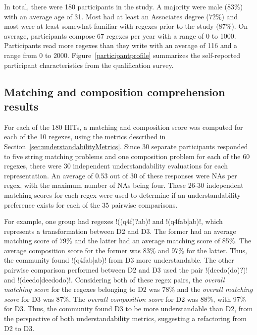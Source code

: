In total, there were 180 participants in the study.
A majority were male (83\%) with an average age of 31. Most had
at least an Associates degree (72\%) and most were at least somewhat familiar with regexes prior to the study (87\%). On average,
participants compose 67 regexes per year with a range of 0 to 1000.
Participants read more regexes than they write with an average of 116 and a range from 0 to 2000.
Figure~\ref{participantprofile} summarizes the self-reported participant characteristics from the qualification survey.

\subsection{Matching and composition comprehension results}
\label{sec:comprehensionResults}

For each of the 180 HITs, a matching and composition score was computed for each of the 10 regexes, using the metrics described in Section~\ref{sec:understandabilityMetrics}.  Since 30 separate participants responded to five string matching problems and one composition problem for each of the 60 regexes, there were 30 independent understandability evaluations for each representation.  An average of 0.53 out of 30 of these responses were NAs per regex, with the maximum number of NAs being four.  These 26-30 independent matching scores for each regex were used to determine if an understandability preference exists for each of the 35 pairwise comparisons.

For example, one group had regexes \cverb!((q4f)?ab)! and \cverb!(q4fab|ab)!, which  represents a transformation between D2 and D3. The former had an average matching score of 79\% and the latter had an average matching score of 85\%. The average composition score for the former was 83\% and 97\% for the latter. Thus, the community found \cverb!(q4fab|ab)! from D3 more understandable.
The other pairwise comparison performed between D2 and D3 used the pair \cverb!(deedo(do)?)! and \cverb!(deedo|deedodo)!.
Considering both of these regex pairs, the \emph{overall matching score} for the regexes belonging to D2 was 78\% and the \emph{overall matching score} for D3 was 87\%.
The \emph{overall composition score} for D2 was 88\%, with 97\% for D3. Thus, the community found D3 to be more understandable than D2, from the perspective of both understandability metrics, suggesting a refactoring from D2 to D3.

